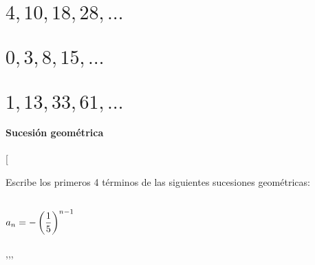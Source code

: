 \documentclass[12pt,addpoints,answers]{repaso}
\begin{document}
\begin{questions}
{        \begin{multicols}{3}
            \begin{parts}
                \part {\large $4,10,18,28,\dots$}

                \begin{solutionbox}{2cm}
                    \fillin[$n^2+3n$][0cm]
                \end{solutionbox}

                \part {\large $0,3,8,15,\dots$}

                \begin{solutionbox}{2cm}
                    \fillin[$n^2-1$][0cm]
                \end{solutionbox}

                \part {\large $1,13,33,61,\dots$}

                \begin{solutionbox}{2cm}
                    \fillin[$4n^2-3$][0cm]
                \end{solutionbox}
            \end{parts}
        \end{multicols}
    }

    \subsection*{Sucesión geométrica}

    \ejemplosboxed[{Escribe los primeros 4 términos de las siguientes sucesiones geométricas:
                \begin{multicols}{2}
                    \begin{parts}
                        \part {\large $\large a_{n}=-\left( \dfrac{1}{5}\right)^{n-1}$}

                        \begin{solutionbox}{2cm}
                            \fillin[$-1$][0cm],\fillin[$-\dfrac{1}{5}$][0cm],\fillin[$-\dfrac{1}{25}$][0cm],\fillin[$-\dfrac{1}{125}$][0cm]
                        \end{solutionbox}


\end{parts}
\end{multicols}}
\end{questions}
\end{document}
